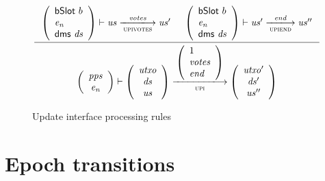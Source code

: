 \documentclass[11pt,a4paper]{article}
\newcommand{\var}[1]{\mathit{#1}}
\newcommand{\fun}[1]{\mathsf{#1}}
\newcommand{\type}[1]{\mathsf{#1}}
\newcommand{\trans}[2]{\xlongrightarrow[\textsc{#1}]{#2}}
\begin{document}
\begin{figure}[ht]
\vspace{20pt}
\begin{equation*}
 \inference
 { {\left(
       \begin{array}{l}
         \bslot{b} \\
         \var{e_n} \\
         \fun{dms} ~ \var{ds}
       \end{array}
     \right)}
   \vdash \var{us} \trans{upivotes}{\var{votes}} \var{us'}
   &
   {\left(
       \begin{array}{l}
         \bslot{b} \\
         \var{e_n} \\
         \fun{dms} ~ \var{ds}
       \end{array}
     \right)}
   \vdash \var{us'} \trans{upiend}{\var{end}} \var{us''}
 }
 {
   \left(
     {\begin{array}{c}
        \var{pps} \\
        \var{e_n}
      \end{array}}
  \right)
  \vdash
  {
    \left(
      {\begin{array}{c}
         \var{utxo} \\
         \var{ds} \\
         \var{us}
       \end{array}}
   \right)
 }
 \trans{upi}
 {
   \left(
     \begin{array}{l}
       1 \\
       \var{votes} \\
       \var{end}
     \end{array}
   \right)
 }
 {
   \left(
     {\begin{array}{c}
        \var{utxo'} \\
        \var{ds'} \\
        \var{us''}
      \end{array}}
  \right)
}
}

\end{equation*}
\caption{Update interface processing rules}
\label{fig:rules:bbody}
\end{figure}

\clearpage

\section{Epoch transitions}

\newcommand{\Epoch}{\type{Epoch}}

\newcommand{\ETState}{\type{ETState}}
\newcommand{\ETEnv}{\type{ETEnv}}
\end{document}
